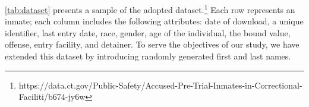 \cref{tab:dataset} presents a sample of the adopted dataset.\footnote{https://data.ct.gov/Public-Safety/Accused-Pre-Trial-Inmates-in-Correctional-Faciliti/b674-jy6w}
Each row represents an inmate; each column includes the following attributes: date of download, a unique identifier, last entry date, race, gender, age of the individual, the bound value, offense, entry facility, and detainer.
To serve the objectives of our study, we have extended this dataset by introducing randomly generated first and last names.



